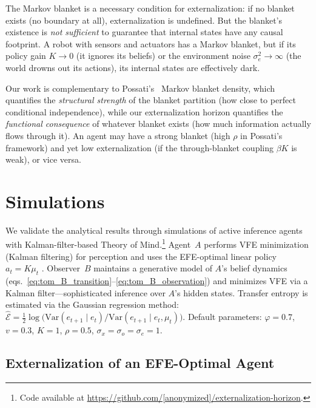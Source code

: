 \documentclass[runningheads]{llncs}
\begin{document}
The Markov blanket is a necessary condition for externalization: if no blanket exists (no boundary at all), externalization is undefined. But the blanket's existence is \emph{not sufficient} to guarantee that internal states have any causal footprint. A robot with sensors and actuators has a Markov blanket, but if its policy gain $K \to 0$ (it ignores its beliefs) or the environment noise $\sigma_e^2 \to \infty$ (the world drowns out its actions), its internal states are effectively dark.

Our work is complementary to Possati's~\cite{possati2025density} Markov blanket density, which quantifies the \emph{structural strength} of the blanket partition (how close to perfect conditional independence), while our externalization horizon quantifies the \emph{functional consequence} of whatever blanket exists (how much information actually flows through it). An agent may have a strong blanket (high $\rho$ in Possati's framework) and yet low externalization (if the through-blanket coupling $\beta K$ is weak), or vice versa.

\section{Simulations}
\label{sec:simulations}

We validate the analytical results through simulations of active inference agents with Kalman-filter-based Theory of Mind.\footnote{Code available at \url{https://github.com/[anonymized]/externalization-horizon}.} Agent~$A$ performs VFE minimization (Kalman filtering) for perception and uses the EFE-optimal linear policy $a_t = K \mu_t$ \cite{baltieri2020kalman}. Observer~$B$ maintains a generative model of $A$'s belief dynamics (eqs.~\ref{eq:tom_B_transition}--\ref{eq:tom_B_observation}) and minimizes VFE via a Kalman filter---sophisticated inference over $A$'s hidden states. Transfer entropy is estimated via the Gaussian regression method: $\hat{\mathcal{E}} = \frac{1}{2}\log\bigl(\text{Var}(e_{t+1} \mid e_t) / \text{Var}(e_{t+1} \mid e_t, \mu_t)\bigr)$. Default parameters: $\varphi = 0.7$, $v = 0.3$, $K = 1$, $\rho = 0.5$, $\sigma_x = \sigma_o = \sigma_e = 1$.

\subsection{Externalization of an EFE-Optimal Agent}
\end{document}
